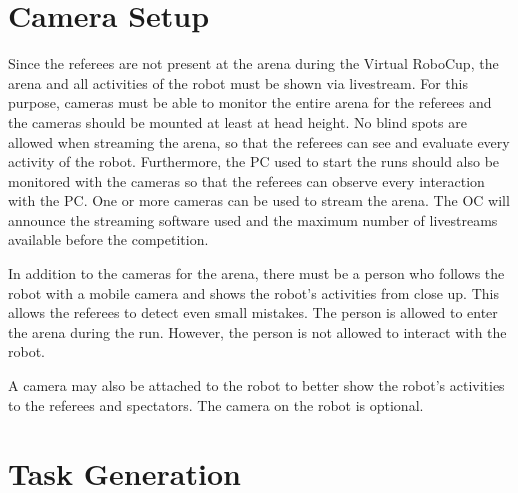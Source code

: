 \section{Camera Setup} 
\label{sec:VRCCameraSetup}

Since the referees are not present at the arena during the Virtual RoboCup, the arena and all activities of the robot must be shown via livestream. For this purpose, cameras must be able to monitor the entire arena for the referees and the cameras should be mounted at least at head height. No blind spots are allowed when streaming the arena, so that the referees can see and evaluate every activity of the robot. Furthermore, the PC used to start the runs should also be monitored with the cameras so that the referees can observe every interaction with the PC. One or more cameras can be used to stream the arena. The OC will announce the streaming software used and the maximum number of livestreams available before the competition.
\par
In addition to the cameras for the arena, there must be a person who follows the robot with a mobile camera and shows the robot's activities from close up. This allows the referees to detect even small mistakes. The person is allowed to enter the arena during the run. However, the person is not allowed to interact with the robot.
\par
A camera may also be attached to the robot to better show the robot's activities to the referees and spectators. The camera on the robot is optional.



\section{Task Generation} 
\label{sec:VRCTaskGen}

